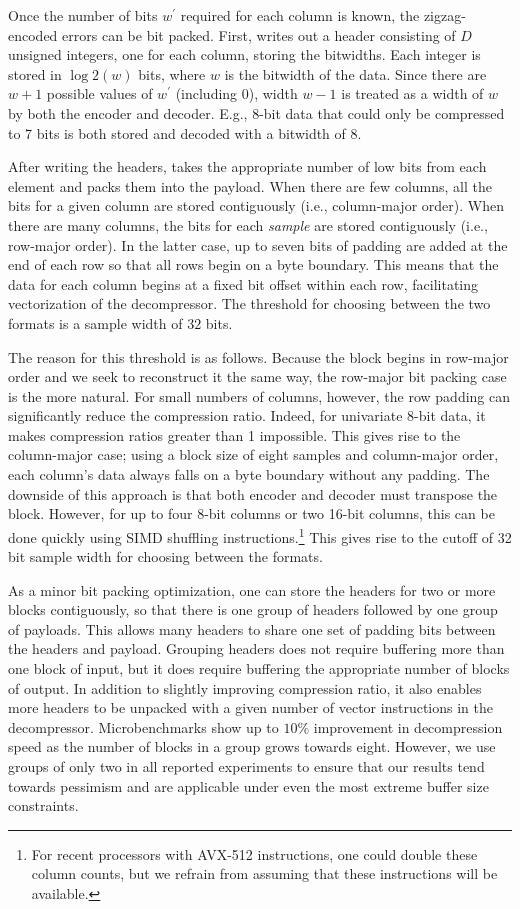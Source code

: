 Once the number of bits $w^\prime$ required for each column is known, the zigzag-encoded errors can be bit packed. First, \minesp writes out a header consisting of $D$ unsigned integers, one for each column, storing the bitwidths. Each integer is stored in $\log2(w)$ bits, where $w$ is the bitwidth of the data. Since there are $w+1$ possible values of $w^\prime$ (including 0), width $w-1$ is treated as a width of $w$ by both the encoder and decoder. E.g., 8-bit data that could only be compressed to 7 bits is both stored and decoded with a bitwidth of 8.

After writing the headers, \minesp takes the appropriate number of low bits from each element and packs them into the payload. When there are few columns, all the bits for a given column are stored contiguously (i.e., column-major order). When there are many columns, the bits for each \textit{sample} are stored contiguously (i.e., row-major order). In the latter case, up to seven bits of padding are added at the end of each row so that all rows begin on a byte boundary. This means that the data for each column begins at a fixed bit offset within each row, facilitating vectorization of the decompressor. The threshold for choosing between the two formats is a sample width of $32$ bits.

The reason for this threshold is as follows. Because the block begins in row-major order and we seek to reconstruct it the same way, the row-major bit packing case is the more natural. For small numbers of columns, however, the row padding can significantly reduce the compression ratio. Indeed, for univariate 8-bit data, it makes compression ratios greater than 1 impossible. This gives rise to the column-major case; using a block size of eight samples and column-major order, each column's data always falls on a byte boundary without any padding. The downside of this approach is that both encoder and decoder must transpose the block. However, for up to four 8-bit columns or two 16-bit columns, this can be done quickly using SIMD shuffling instructions.\footnote{For recent processors with AVX-512 instructions, one could double these column counts, but we refrain from assuming that these instructions will be available.} This gives rise to the cutoff of 32 bit sample width for choosing between the formats.

As a minor bit packing optimization, one can store the headers for two or more blocks contiguously, so that there is one group of headers followed by one group of payloads. This allows many headers to share one set of padding bits between the headers and payload. Grouping headers does not require buffering more than one block of input, but it does require buffering the appropriate number of blocks of output. In addition to slightly improving compression ratio, it also enables more headers to be unpacked with a given number of vector instructions in the decompressor. Microbenchmarks show up to $10\%$ improvement in decompression speed as the number of blocks in a group grows towards eight. However, we use groups of only two in all reported experiments to ensure that our results tend towards pessimism and are applicable under even the most extreme buffer size constraints.


